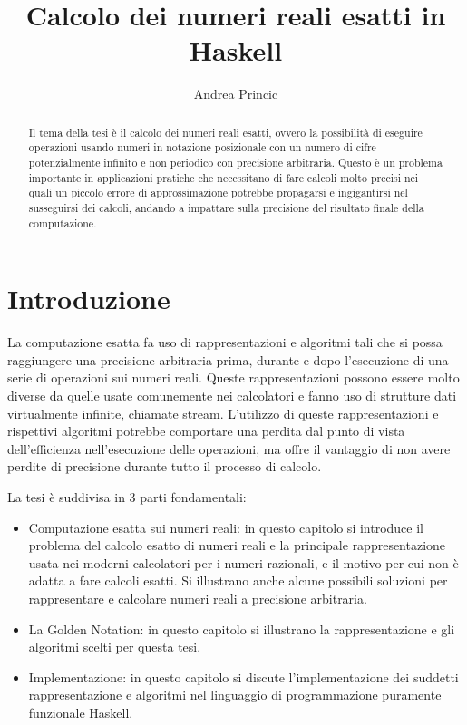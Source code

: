 \documentclass[Lau]{sapthesis}
\title{Calcolo dei numeri reali esatti in Haskell}
\author{Andrea Princic}
\begin{document}
\frontmatter
\maketitle



\begin{abstract}
Il tema della tesi è il calcolo dei numeri reali esatti, ovvero la possibilità 
di eseguire operazioni usando numeri in notazione posizionale con un numero di cifre 
potenzialmente infinito e non periodico con precisione arbitraria. Questo è un 
problema importante in applicazioni pratiche che necessitano di fare calcoli 
molto precisi nei quali un piccolo errore di approssimazione potrebbe propagarsi 
e ingigantirsi nel susseguirsi dei calcoli, andando a impattare sulla precisione 
del risultato finale della computazione.
\end{abstract}



\tableofcontents



\mainmatter



\chapter{Introduzione}
La computazione esatta fa uso di rappresentazioni e algoritmi tali che si possa raggiungere una precisione arbitraria prima, durante e dopo l'esecuzione di una serie di operazioni sui numeri reali. Queste rappresentazioni possono essere molto diverse da quelle usate comunemente nei calcolatori e fanno uso di strutture dati virtualmente infinite, chiamate stream. L'utilizzo di queste rappresentazioni e rispettivi algoritmi potrebbe comportare una perdita dal punto di vista dell'efficienza nell'esecuzione delle operazioni, ma offre il vantaggio di non avere perdite di precisione durante tutto il processo di calcolo.

La tesi è suddivisa in 3 parti fondamentali:
\begin{itemize}
\item Computazione esatta sui numeri reali: in questo capitolo si introduce il problema del calcolo esatto di numeri reali e la principale rappresentazione usata nei moderni calcolatori per i numeri razionali, e il motivo per cui non è adatta a fare calcoli esatti. Si illustrano anche alcune possibili soluzioni per rappresentare e calcolare numeri reali a precisione arbitraria.
\item La Golden Notation: in questo capitolo si illustrano la rappresentazione e gli algoritmi scelti per questa tesi.
\item Implementazione: in questo capitolo si discute l'implementazione dei suddetti rappresentazione e algoritmi nel linguaggio di programmazione puramente funzionale Haskell.
\end{itemize}
\end{document}
